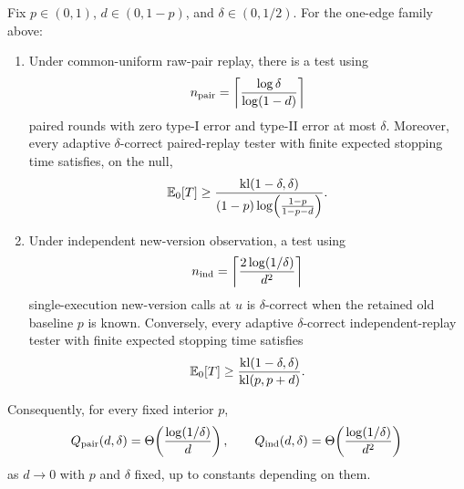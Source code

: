 \begin{theorem}
\label{thm:bernoulli-separation}
Fix $p\in(0,1)$, $d\in(0,1-p)$, and $\delta\in(0,1/2)$.  For the one-edge family above:

\begin{enumerate}[label=(\roman*)]
\item Under common-uniform raw-pair replay, there is a test using
\begin{equation}\label{eq:formal-results-007}
n_{\rm pair}
=
\left\lceil
\frac{\log \delta}{\log(1-d)}
\right\rceil
\end{equation}
paired rounds with zero type-I error and type-II error at most $\delta$.
Moreover, every adaptive $\delta$-correct paired-replay tester with finite
expected stopping time satisfies, on the null,
\begin{equation}\label{eq:formal-results-008}
\mathbb{E}_0[T]
\ge
\frac{\mathrm{kl}(1-\delta,\delta)}
{(1-p)\log\!\left(\frac{1-p}{1-p-d}\right)}.
\end{equation}

\item Under independent new-version observation, a test using
\begin{equation}\label{eq:formal-results-009}
n_{\rm ind}
=
\left\lceil
\frac{2\log(1/\delta)}{d^2}
\right\rceil
\end{equation}
single-execution new-version calls at $u$ is $\delta$-correct when the retained old baseline
$p$ is known.  Conversely, every adaptive $\delta$-correct independent-replay
tester with finite expected stopping time satisfies
\begin{equation}\label{eq:formal-results-010}
\mathbb{E}_0[T]
\ge
\frac{\mathrm{kl}(1-\delta,\delta)}
{\mathrm{kl}(p,p+d)}.
\end{equation}
\end{enumerate}

Consequently, for every fixed interior $p$,
\begin{equation}\label{eq:formal-results-011}
Q_{\rm pair}(d,\delta)
=
\Theta\!\left(
\frac{\log(1/\delta)}{d}
\right),
\qquad
Q_{\rm ind}(d,\delta)
=
\Theta\!\left(
\frac{\log(1/\delta)}{d^2}
\right)
\end{equation}
as $d\to0$ with $p$ and $\delta$ fixed, up to constants depending on them.
\end{theorem}

